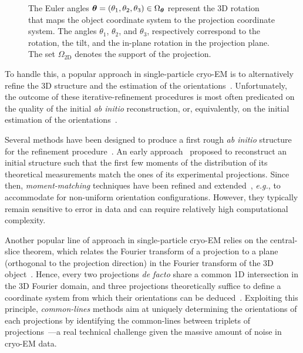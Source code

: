 \begin{figure}
{    The Euler angles ${\boldsymbol{\theta}}=(\theta_1,\theta_2,\theta_3)\in\Omega_{\boldsymbol{\theta}}$ represent the 3D rotation that maps the object coordinate system to the projection coordinate system.
    The angles $\theta_1$, $\theta_2$, and $\theta_3$, respectively correspond to the rotation, the tilt, and the in-plane rotation in the projection plane.
    The set $\Omega_{\mathrm{2D}}$ denotes the support of the projection.
     
}\label{fig:imaging-geometry}
\end{figure}

To handle this, a popular approach in single-particle cryo-EM is to alternatively refine the 3D structure and the estimation of the orientations~\cite{penczek1994ribosome,Baker1996,Dempster1977,sigworth1998maximum,scheres2012bayesian,zehni2020joint}. Unfortunately, the outcome of these iterative-refinement procedures is most often predicated on the quality of the initial \textit{ab initio} reconstruction, or, equivalently, on the initial estimation of the orientations~\cite{sorzano2006optimization,henderson2012outcome}.

Several methods have been designed to produce a first rough \textit{ab initio} structure for the refinement procedure~\cite{singer2020computational}. An early approach~\cite{kam1980reconstruction} proposed to reconstruct an initial structure such that the first few moments of the distribution of its theoretical measurements match the ones of its experimental projections. Since then, \textit{moment-matching} techniques have been refined and extended~\cite{salzman1990method,goncharov1988integral,sharon2019method}, \textit{e.g.}, to accommodate for non-uniform orientation configurations. However, they typically remain sensitive to error in data and can require relatively high computational complexity.  %

Another popular line of approach in single-particle cryo-EM  relies on the central-slice theorem, which relates the Fourier transform of a projection to a plane (orthogonal to the projection direction) in the Fourier transform of the 3D object~\cite{Natterer2001mathematics}. Hence, every two projections \textit{de facto} share a common 1D intersection in the 3D Fourier domain, and three projections theoretically suffice to define a coordinate system from which their orientations can be deduced~\cite{van1987angular}. Exploiting this principle, \textit{common-lines} methods aim at uniquely determining the orientations of each projections by identifying the common-lines between triplets of projections~\cite{penczek1994ribosome,mallick2006structure,singer2010detecting,wang2013orientation,greenberg2017common,pragier2019common}---a real technical challenge given the massive amount of noise in cryo-EM data. %

